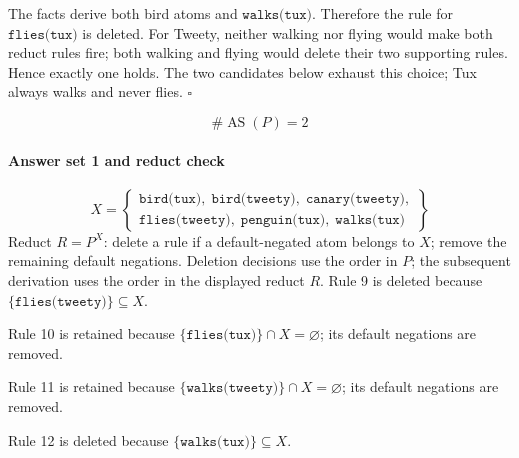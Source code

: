 \documentclass[a4paper,11pt]{article}
\newif\ifexplain
\newcommand{\explain}[1]{\ifexplain\begin{erklbox}#1\end{erklbox}\fi}
\newcommand{\at}[1]{\texttt{#1}}
\begin{document}
The facts derive both bird atoms and $\at{walks(tux)}$. Therefore the rule for $\at{flies(tux)}$ is deleted. For Tweety, neither walking nor flying would make both reduct rules fire; both walking and flying would delete their two supporting rules. Hence exactly one holds. The two candidates below exhaust this choice; Tux always walks and never flies. $\square$
\explain{Zuerst klären wir, welche Kombinationen überhaupt möglich sind. Gegenseitige Default-Negation lässt genau eine der beiden Eigenschaften zu. Eine Regel mit \texttt{not p} und Kopf $p$ kann einen Fall ausschließen, statt einfach $p$ zu einer stabilen Lösung hinzuzufügen. Die Redukt-Proben darunter prüfen jede verbliebene Kombination einzeln.}
\[
\boxed{\#\operatorname{AS}(P)=2}
\]
\paragraph{Answer set 1 and reduct check}
\[
X=\left\{\begin{gathered}\at{bird(tux)},\;\at{bird(tweety)},\;\at{canary(tweety)},\\\at{flies(tweety)},\;\at{penguin(tux)},\;\at{walks(tux)}\end{gathered}\right\}
\]
Reduct $R=P^X$: delete a rule if a default-negated atom belongs to $X$; remove the remaining default negations. Deletion decisions use the order in $P$; the subsequent derivation uses the order in the displayed reduct $R$.
Rule 9 is deleted because $\{\at{flies(tweety)}\}\subseteq X$.

Rule 10 is retained because $\{\at{flies(tux)}\}\cap X=\varnothing$; its default negations are removed.

Rule 11 is retained because $\{\at{walks(tweety)}\}\cap X=\varnothing$; its default negations are removed.

Rule 12 is deleted because $\{\at{walks(tux)}\}\subseteq X$.
\end{document}
